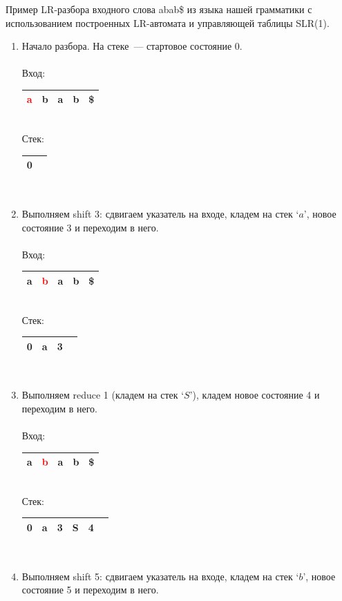 \begin{example}
Пример LR-разбора входного слова abab\$ из языка нашей грамматики с использованием построенных LR-автомата и управляющей таблицы SLR(1).
\begin{enumerate}
\item Начало разбора. На стеке~--- стартовое состояние 0. \\ \\
Вход: \,
\begin{tabular}[c]{ |c|c|c|c|c| }
    \hline \textcolor{red}{a} & b & a & b & \$ \\ \hline
\end{tabular} \\
Стек: \,
\begin{tabular}[c]{ |c|c }
    \hline 0 & \\ \hline
\end{tabular}
\\
\item Выполняем shift 3: сдвигаем указатель на входе, кладем на стек `$a$', новое состояние 3 и переходим в него. \\ \\
Вход: \,
\begin{tabular}[c]{ |c|c|c|c|c| }
    \hline a & \textcolor{red}{b} & a & b & \$ \\ \hline
\end{tabular} \\
Стек: \,
\begin{tabular}[c]{ |c|c|c|c }
    \hline 0 & a & 3 & \\ \hline
\end{tabular}
\\
\item Выполняем reduce 1 (кладем на стек `$S$'), кладем новое состояние 4 и переходим в него. \\ \\
Вход: \,
\begin{tabular}[c]{ |c|c|c|c|c| }
    \hline a & \textcolor{red}{b} & a & b & \$ \\ \hline
\end{tabular} \\
Стек: \,
\begin{tabular}[c]{ |c|c|c|c|c|c }
    \hline 0 & a & 3 & S & 4 & \\ \hline
\end{tabular}
\\
\item Выполняем shift 5: сдвигаем указатель на входе, кладем на стек `$b$', новое состояние 5 и переходим в него. \\ \\

\end{enumerate}
\end{example}

